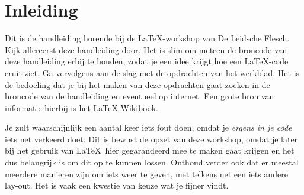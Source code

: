 \maketitle
\tableofcontents
\newpage

\section{Inleiding}

Dit is de handleiding horende bij de \LaTeX-workshop van De Leidsche Flesch.
Kijk allereerst deze handleiding door. Het is slim om meteen de broncode van
deze handleiding erbij te houden, zodat je een idee krijgt hoe een \LaTeX-code
eruit ziet. Ga vervolgens aan de slag met de opdrachten van het werkblad. Het is
de bedoeling dat je bij het maken van deze opdrachten gaat zoeken in de broncode
van de handleiding en eventueel op internet. Een grote bron van informatie
hierbij is het \LaTeX-Wikibook\cite{wikibook}.


Je zult waarschijnlijk een aantal keer iets fout doen, omdat je \emph{ergens in
je code} iets net verkeerd doet. Dit is bewust de opzet van deze workshop, omdat
je later bij het gebruik van \LaTeX\ hier gegarandeerd mee te maken gaat krijgen
en het dus belangrijk is om dit op te kunnen lossen. Onthoud verder ook dat er
meestal meerdere manieren zijn om iets weer te geven, met telkens net een iets
andere lay-out. Het is vaak een kwestie van keuze wat je fijner vindt.


